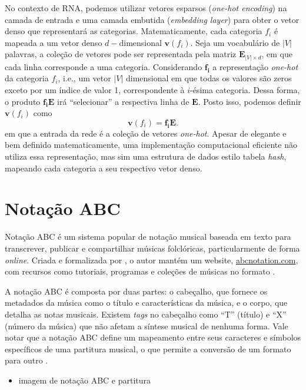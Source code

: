 \documentclass{automatextcc}
\newcommand{\bs}[1]{\boldsymbol{#1}}
\begin{document}
No contexto de RNA, podemos utilizar vetores esparsos (\textit{one-hot encoding}) na camada de entrada e uma camada embutida (\textit{embedding layer}) para obter o vetor denso que representará as categorias. Matematicamente, cada categoria $f_i$ é mapeada a um vetor denso $d-$dimensional $\bs v(f_i)$. Seja um vocabulário de $|V|$ palavras, a coleção de vetores pode ser representada pela matriz $\bs{E}_{|V| \times d}$, em que cada linha corresponde a uma categoria. Considerando $\bs{f_i}$ a representação \textit{one-hot} da categoria $f_i$, i.e., um vetor $|V|$ dimensional em que todas os valores são zeros exceto por um índice de valor 1, correspondente à $i$-ésima categoria. Dessa forma, o produto $\bs{f_i E}$ irá ``selecionar'' a respectiva linha de $\bs{E}$. Posto isso, podemos definir $\bs v(f_i)$ como
\begin{equation*}
    \bs v(f_i) = \bs{f_i E}.
\end{equation*}
em que a entrada da rede é a coleção de vetores \textit{one-hot}. Apesar de elegante e bem definido matematicamente, uma implementação computacional eficiente não utiliza essa representação, mas sim uma estrutura de dados estilo tabela \textit{hash}, mapeando cada categoria a seu respectivo vetor denso.
\citep{goldberg2017}



\section{Notação ABC}
Notação ABC é um sistema popular de notação musical baseada em texto para transcrever, publicar e compartilhar músicas folclóricas, particularmente de forma \textit{online}. Criada e formalizada por \citet{walshaw1993}, o autor mantém um website, \url{abcnotation.com}, com recursos como tutoriais, programas e coleções de músicas no formato \citep{walshaw2014}.

A notação ABC é composta por duas partes: o cabeçalho, que fornece os metadados da música como o título e características da música, e o corpo, que detalha as notas musicais. Existem \textit{tags} no cabeçalho como ``T'' (título) e ``X'' (número da música) que não afetam a síntese musical de nenhuma forma. Vale notar que a notação ABC define um mapeamento entre seus caracteres e símbolos específicos de uma partitura musical, o que permite a conversão de um formato para outro \citep{agarwala2017}. 

\begin{itemize}
    \item imagem de notação ABC e partitura
\end{itemize}
\end{document}
